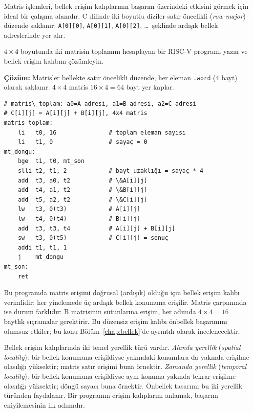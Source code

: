 Matris işlemleri, bellek erişim kalıplarının başarım üzerindeki etkisini görmek için ideal bir çalışma alanıdır. C dilinde iki boyutlu diziler satır öncelikli (\emph{row-major}) düzende saklanır: \texttt{A[0][0]}, \texttt{A[0][1]}, \texttt{A[0][2]}, \ldots\ şeklinde ardışık bellek adreslerinde yer alır.

\begin{ornek}[4.22]
\label{orn:matris-toplam}
$4 \times 4$ boyutunda iki matrisin toplamını hesaplayan bir RISC-V programı yazın ve bellek erişim kalıbını çözümleyin.

\textbf{Çözüm:} Matrisler bellekte satır öncelikli düzende, her eleman \texttt{.word} (4 bayt) olarak saklanır. $4 \times 4$ matris $16 \times 4 = 64$ bayt yer kaplar.

\begin{lstlisting}[style=riscv]
# matris\_toplam: a0=A adresi, a1=B adresi, a2=C adresi
# C[i][j] = A[i][j] + B[i][j], 4x4 matris
matris_toplam:
    li   t0, 16               # toplam eleman sayısı
    li   t1, 0                # sayaç = 0
mt_dongu:
    bge  t1, t0, mt_son
    slli t2, t1, 2            # bayt uzaklığı = sayaç * 4
    add  t3, a0, t2           # \&A[i][j]
    add  t4, a1, t2           # \&B[i][j]
    add  t5, a2, t2           # \&C[i][j]
    lw   t3, 0(t3)            # A[i][j]
    lw   t4, 0(t4)            # B[i][j]
    add  t3, t3, t4           # A[i][j] + B[i][j]
    sw   t3, 0(t5)            # C[i][j] = sonuç
    addi t1, t1, 1
    j    mt_dongu
mt_son:
    ret
\end{lstlisting}

Bu programda matris erişimi doğrusal (ardışık) olduğu için bellek erişim kalıbı verimlidir: her yinelemede üç ardışık bellek konumuna erişilir. Matris çarpımında ise durum farklıdır: B matrisinin sütunlarına erişim, her adımda $4 \times 4 = 16$ baytlık sıçramalar gerektirir. Bu düzensiz erişim kalıbı önbellek başarımını olumsuz etkiler; bu konu Bölüm~\ref{chap:bellek}'de ayrıntılı olarak incelenecektir.
\end{ornek}

\begin{bilginot}
Bellek erişim kalıplarında iki temel yerellik türü vardır. \emph{Alanda yerellik} (\emph{spatial locality}): bir bellek konumuna erişildiyse yakındaki konumlara da yakında erişilme olasılığı yüksektir; matris satır erişimi buna örnektir. \emph{Zamanda yerellik} (\emph{temporal locality}): bir bellek konumuna erişildiyse aynı konuma yakında tekrar erişilme olasılığı yüksektir; döngü sayacı buna örnektir. Önbellek tasarımı bu iki yerellik türünden faydalanır. Bir programın erişim kalıplarını anlamak, başarım eniyilemesinin ilk adımıdır.
\end{bilginot}


